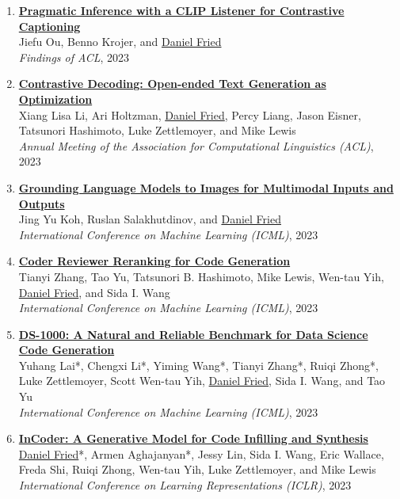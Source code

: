 \begin{enumerate}[leftmargin=-1mm,partopsep=0pt]
\item \href{https://arxiv.org/abs/2306.08818}{\textbf{Pragmatic Inference with a CLIP Listener for Contrastive Captioning}} \\
  Jiefu Ou, Benno Krojer, and \underline{Daniel Fried}\\
  \emph{Findings of ACL}, 2023

\item \href{https://arxiv.org/abs/2210.15097}{\textbf{Contrastive Decoding: Open-ended Text Generation as Optimization}} \\
  Xiang Lisa Li, Ari Holtzman, \underline{Daniel Fried}, Percy Liang, Jason Eisner, Tatsunori Hashimoto, Luke Zettlemoyer, and Mike Lewis\\
  \emph{Annual Meeting of the Association for Computational Linguistics (ACL)}, 2023

\item \href{https://arxiv.org/abs/2301.13823}{\textbf{Grounding Language Models to Images for Multimodal Inputs and Outputs}} \\
  Jing Yu Koh, Ruslan Salakhutdinov, and \underline{Daniel Fried}\\
  \emph{International Conference on Machine Learning (ICML)}, 2023

\item \href{https://arxiv.org/abs/2211.16490}{\textbf{Coder Reviewer Reranking for Code Generation}} \\
  Tianyi Zhang, Tao Yu, Tatsunori B. Hashimoto, Mike Lewis, Wen-tau Yih, \underline{Daniel Fried}, and Sida I. Wang\\
  \emph{International Conference on Machine Learning (ICML)}, 2023

\item \href{https://arxiv.org/abs/2211.11501}{\textbf{DS-1000: A Natural and Reliable Benchmark for Data Science Code Generation}} \\
  Yuhang Lai*, Chengxi Li*, Yiming Wang*, Tianyi Zhang*, Ruiqi Zhong*, Luke Zettlemoyer, Scott Wen-tau Yih, \underline{Daniel Fried}, Sida I. Wang, and Tao Yu\\
  \emph{International Conference on Machine Learning (ICML)}, 2023

\item \href{https://arxiv.org/abs/2204.05999}{\textbf{InCoder: A Generative Model for Code Infilling and Synthesis}} \\
  \underline{Daniel Fried}*, Armen Aghajanyan*, Jessy Lin, Sida I. Wang, Eric Wallace, Freda Shi, Ruiqi Zhong, Wen-tau Yih, Luke Zettlemoyer, and Mike Lewis\\
  \emph{International Conference on Learning Representations (ICLR)}, 2023


\end{enumerate}

